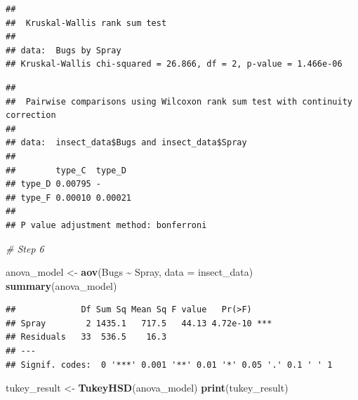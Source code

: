 \documentclass[
]{article}
\newenvironment{Shaded}{\begin{snugshade}}{\end{snugshade}}
\newcommand{\AttributeTok}[1]{\textcolor[rgb]{0.13,0.29,0.53}{#1}}
\newcommand{\CommentTok}[1]{\textcolor[rgb]{0.56,0.35,0.01}{\textit{#1}}}
\newcommand{\FunctionTok}[1]{\textcolor[rgb]{0.13,0.29,0.53}{\textbf{#1}}}
\newcommand{\NormalTok}[1]{#1}
\newcommand{\OtherTok}[1]{\textcolor[rgb]{0.56,0.35,0.01}{#1}}
\newcommand{\SpecialCharTok}[1]{\textcolor[rgb]{0.81,0.36,0.00}{\textbf{#1}}}
\newcommand{\StringTok}[1]{\textcolor[rgb]{0.31,0.60,0.02}{#1}}
\begin{document}
\begin{verbatim}
## 
##  Kruskal-Wallis rank sum test
## 
## data:  Bugs by Spray
## Kruskal-Wallis chi-squared = 26.866, df = 2, p-value = 1.466e-06
\end{verbatim}

\begin{Shaded}
\end{Shaded}

\begin{verbatim}
## 
##  Pairwise comparisons using Wilcoxon rank sum test with continuity correction 
## 
## data:  insect_data$Bugs and insect_data$Spray 
## 
##        type_C  type_D 
## type_D 0.00795 -      
## type_F 0.00010 0.00021
## 
## P value adjustment method: bonferroni
\end{verbatim}

\begin{Shaded}
\begin{Highlighting}[]
\CommentTok{\# Step 6}

\NormalTok{anova\_model }\OtherTok{\textless{}{-}} \FunctionTok{aov}\NormalTok{(Bugs }\SpecialCharTok{\textasciitilde{}}\NormalTok{ Spray, }\AttributeTok{data =}\NormalTok{ insect\_data)}
\FunctionTok{summary}\NormalTok{(anova\_model)}
\end{Highlighting}
\end{Shaded}

\begin{verbatim}
##             Df Sum Sq Mean Sq F value   Pr(>F)    
## Spray        2 1435.1   717.5   44.13 4.72e-10 ***
## Residuals   33  536.5    16.3                     
## ---
## Signif. codes:  0 '***' 0.001 '**' 0.01 '*' 0.05 '.' 0.1 ' ' 1
\end{verbatim}

\begin{Shaded}
\begin{Highlighting}[]
\NormalTok{tukey\_result }\OtherTok{\textless{}{-}} \FunctionTok{TukeyHSD}\NormalTok{(anova\_model)}
\FunctionTok{print}\NormalTok{(tukey\_result)}
\end{Highlighting}
\end{Shaded}
\end{document}
